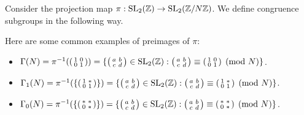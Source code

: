 Consider the projection map $\pi: \operatorname{SL}_2(\mathbb{Z}) \rightarrow \operatorname{SL}_2(\mathbb{Z}/N\mathbb{Z})$. We define congruence subgroups in the following way.

\begin{example}\label{example:1_congsgp}
Here are some common examples of preimages of $\pi$:

\begin{itemize}
    \item $\Gamma(N) = \pi^{-1} (\begin{psmallmatrix}
        1 & 0 \\ 0 & 1
    \end{psmallmatrix}) = \{ \begin{psmallmatrix}
        a & b \\ c & d 
    \end{psmallmatrix} \in \operatorname{SL}_2(\mathbb{Z}): \begin{psmallmatrix}
        a & b \\ c & d 
    \end{psmallmatrix} \equiv \begin{psmallmatrix}
        1 & 0 \\ 0 & 1 
    \end{psmallmatrix} \pmod{N}\}$.
    \item $\Gamma_1(N) = \pi^{-1} (\{\begin{psmallmatrix}
        1 & \ast \\ 0 & 1
    \end{psmallmatrix}\}) = \{ \begin{psmallmatrix}
        a & b \\ c & d 
    \end{psmallmatrix} \in \operatorname{SL}_2(\mathbb{Z}): \begin{psmallmatrix}
        a & b \\ c & d 
    \end{psmallmatrix} \equiv \begin{psmallmatrix}
        1 & \ast \\ 0 & 1 
    \end{psmallmatrix} \pmod{N}\}$.
    \item $\Gamma_0(N) = \pi^{-1} (\{\begin{psmallmatrix}
        \ast & \ast \\ 0 & \ast
    \end{psmallmatrix}\}) = \{ \begin{psmallmatrix}
        a & b \\ c & d 
    \end{psmallmatrix} \in \operatorname{SL}_2(\mathbb{Z}): \begin{psmallmatrix}
        a & b \\ c & d 
    \end{psmallmatrix} \equiv \begin{psmallmatrix}
        \ast & \ast \\ 0 & \ast 
    \end{psmallmatrix} \pmod{N}\}$.
\end{itemize}
\end{example}

